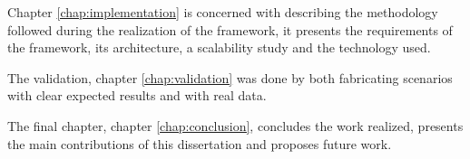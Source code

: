 Chapter \ref{chap:implementation} is concerned with describing the methodology 
followed during the realization of the framework, it presents the requirements 
of the framework, its architecture, a scalability study and the technology used.

The validation, chapter \ref{chap:validation} was done by both fabricating 
scenarios with clear expected results and with real data.

The final chapter, chapter \ref{chap:conclusion}, concludes the work realized, 
presents the main contributions of this dissertation and proposes future work.

